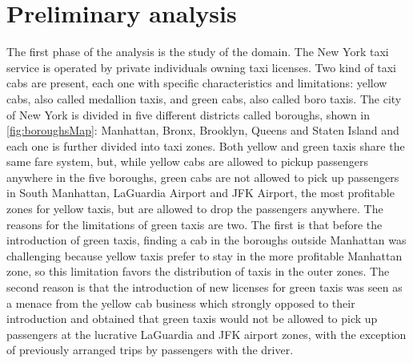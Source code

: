 \documentclass{acm_proc_article-sp-sigmod09}
\begin{document}
\section{Preliminary analysis}
\label{sec:preliminaryAnalysis}
The first phase of the analysis is the study of the domain. The New York taxi service is operated by private individuals owning taxi licenses. Two kind of taxi cabs are present, each one with specific characteristics and limitations: yellow cabs, also called medallion taxis, and green cabs, also called boro taxis. The city of New York is divided in five different districts called boroughs, shown in \cref{fig:boroughsMap}: Manhattan, Bronx, Brooklyn, Queens and Staten Island and each one is further divided into taxi zones. Both yellow and green taxis share the same fare system, but, while yellow cabs are allowed to pickup passengers anywhere in the five boroughs, green cabs are not allowed to pick up passengers in South Manhattan, LaGuardia Airport and JFK Airport, the most profitable zones for yellow taxis, but are allowed to drop the passengers anywhere. The reasons for the limitations of green taxis are two. The first is that before the introduction of green taxis, finding a cab in the boroughs outside Manhattan was challenging because yellow taxis prefer to stay in the more profitable Manhattan zone, so this limitation favors the distribution of taxis in the outer zones. The second reason is that the introduction of new licenses for green taxis was seen as a menace from the yellow cab business which strongly opposed to their introduction and obtained that green taxis would not be allowed to pick up passengers at the lucrative LaGuardia and JFK airport zones, with the exception of previously arranged trips by passengers with the driver.
\end{document}
